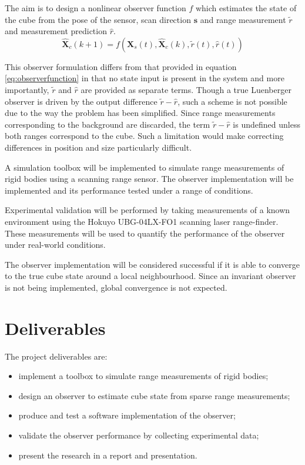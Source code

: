 The aim is to design a nonlinear observer function $f$ which estimates the state of the cube from the pose of the sensor, scan direction $\mathbf{s}$ and range measurement $\tilde{r}$ and measurement prediction $\hat{r}$.
\begin{equation}
	\hat{\mathbf{X}}_{c}(k+1) = f(\mathbf{X}_{s}(t),\hat{\mathbf{X}}_{c}(k),\tilde{r}(t),\hat{r}(t))
\end{equation}

This observer formulation differs from that provided in equation \ref{eq:observerfunction} in that no state input is present in the system and more importantly, $\tilde{r}$ and $\hat{r}$ are provided as separate terms. Though a true Luenberger observer is driven by the output difference $\tilde{r} - \hat{r}$, such a scheme is not possible due to the way the problem has been simplified. Since range measurements corresponding to the background are discarded, the term $\tilde{r} - \hat{r}$ is undefined unless both ranges correspond to the cube. Such a limitation would make correcting differences in position and size particularly difficult.

A simulation toolbox will be implemented to simulate range measurements of rigid bodies using a scanning range sensor. The observer implementation will be implemented and its performance tested under a range of conditions. 

Experimental validation will be performed by taking measurements of a known environment using the Hokuyo UBG-04LX-FO1 scanning laser range-finder. These measurements will be used to quantify the performance of the observer under real-world conditions.

The observer implementation will be considered successful if it is able to converge to the true cube state around a local neighbourhood. Since an invariant observer is not being implemented, global convergence is not expected.

\section{Deliverables}
The project deliverables are:
\begin{itemize}
\item implement a toolbox to simulate range measurements of rigid bodies;
\item design an observer to estimate cube state from sparse range measurements;
\item produce and test a software implementation of the observer;
\item validate the observer performance by collecting experimental data;
\item present the research in a report and presentation.
\end{itemize}
